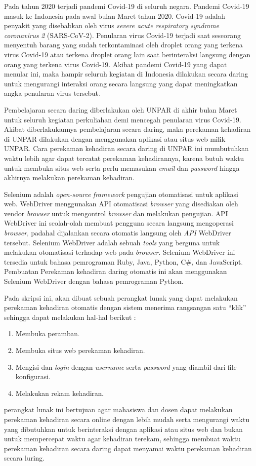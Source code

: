 \documentclass[a4paper,twoside]{article}
\begin{document}
Pada tahun 2020 terjadi pandemi Covid-19 di seluruh negara. Pandemi Covid-19 masuk ke Indonesia pada awal bulan Maret tahun 2020. Covid-19 adalah penyakit yang disebabkan oleh virus \textit{severe acute respiratory syndrome coronavirus 2} (SARS-CoV-2). Penularan virus Covid-19 terjadi saat seseorang menyentuh barang yang sudah terkontaminasi oleh droplet orang yang terkena virus Covid-19 atau terkena droplet orang lain saat berinteraksi langsung dengan orang yang terkena virus Covid-19.  Akibat pandemi Covid-19 yang dapat menular ini, maka hampir seluruh kegiatan di Indonesia dilakukan secara daring untuk mengurangi interaksi orang secara langsung yang dapat meningkatkan angka penularan virus tersebut. 

Pembelajaran secara daring diberlakukan oleh UNPAR di akhir bulan Maret untuk seluruh kegiatan perkuliahan demi mencegah penularan virus Covid-19. Akibat diberlakukannya pembelajaran secara daring, maka perekaman kehadiran di UNPAR dilakukan dengan menggunakan aplikasi atau situs web milik UNPAR. Cara perekaman kehadiran secara daring di UNPAR ini mumbutuhkan waktu lebih agar dapat tercatat perekaman kehadirannya, karena butuh waktu untuk membuka situs web serta perlu memasukan \textit{email} dan \textit{password} hingga akhirnya melakukan perekaman kehadiran. 

Selenium adalah \textit{open-source} \textit{framework} pengujian otomatisasi untuk aplikasi web. WebDriver menggunakan API otomatisasi \textit{browser} yang disediakan oleh vendor \textit{browser} untuk mengontrol \textit{browser} dan melakukan pengujian. API WebDriver ini seolah-olah membuat pengguna secara langsung mengoperasi \textit{browser}, padahal dijalankan secara otomatis langsung oleh \textit{API} WebDriver tersebut. Selenium WebDriver adalah sebuah \textit{tools} yang berguna untuk melakukan otomatisasi terhadap web pada \textit{browser}. Selenium WebDriver ini tersedia untuk bahasa pemrograman Ruby, Java, Python, C\#, dan JavaScript. Pembuatan Perekaman kehadiran daring otomatis ini akan menggunakan Selenium WebDriver dengan bahasa pemrograman Python.  

Pada skripsi ini, akan dibuat sebuah perangkat lunak yang dapat melakukan perekaman kehadiran otomatis dengan sistem menerima rangsangan satu ``klik'' sehingga dapat melakukan hal-hal berikut :
\begin{enumerate}
	\item Membuka peramban.
	\item Membuka situs web perekaman kehadiran.
	\item Mengisi dan \textit{login} dengan \textit{username} serta \textit{password} yang diambil dari file konfigurasi.
	\item Melakukan rekam kehadiran.
\end{enumerate} 
perangkat lunak ini bertujuan agar mahasiswa dan dosen dapat melakukan perekaman kehadiran secara online dengan lebih mudah serta mengurangi waktu yang dibutuhkan untuk berinteraksi dengan aplikasi atau situs web dan bukan untuk mempercepat waktu agar kehadiran terekam, sehingga membuat waktu perekaman kehadiran secara daring dapat menyamai waktu perekaman kehadiran secara luring. 
\end{document}
